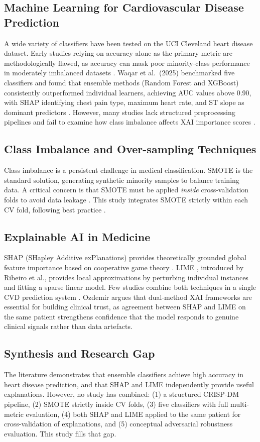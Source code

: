 \documentclass[conference]{IEEEtran}
\begin{document}
\subsection{Machine Learning for Cardiovascular Disease Prediction}
A wide variety of classifiers have been tested on the UCI Cleveland heart disease dataset. Early studies relying on accuracy alone as the primary metric are methodologically flawed, as accuracy can mask poor minority-class performance in moderately imbalanced datasets \cite{ali2019}. Waqar et al.\ (2025) benchmarked five classifiers and found that ensemble methods (Random Forest and XGBoost) consistently outperformed individual learners, achieving AUC values above 0.90, with SHAP identifying chest pain type, maximum heart rate, and ST slope as dominant predictors \cite{lamir2025}. However, many studies lack structured preprocessing pipelines and fail to examine how class imbalance affects XAI importance scores \cite{uddin2026}.

\subsection{Class Imbalance and Over-sampling Techniques}
Class imbalance is a persistent challenge in medical classification. SMOTE \cite{fernandez2018} is the standard solution, generating synthetic minority samples to balance training data. A critical concern is that SMOTE must be applied \textit{inside} cross-validation folds to avoid data leakage \cite{yadav2020}. This study integrates SMOTE strictly within each CV fold, following best practice \cite{mujahid2024}.

\subsection{Explainable AI in Medicine}
SHAP (SHapley Additive exPlanations) provides theoretically grounded global feature importance based on cooperative game theory \cite{kim2025}. LIME \cite{ribeiro2016}, introduced by Ribeiro et al., provides local approximations by perturbing individual instances and fitting a sparse linear model. Few studies combine both techniques in a single CVD prediction system \cite{ahmed2024, admassu2023}. Ozdemir \cite{ozdemir2024} argues that dual-method XAI frameworks are essential for building clinical trust, as agreement between SHAP and LIME on the same patient strengthens confidence that the model responds to genuine clinical signals rather than data artefacts.

\subsection{Synthesis and Research Gap}
The literature demonstrates that ensemble classifiers achieve high accuracy in heart disease prediction, and that SHAP and LIME independently provide useful explanations. However, no study has combined: (1) a structured CRISP-DM pipeline, (2) SMOTE strictly inside CV folds, (3) five classifiers with full multi-metric evaluation, (4) both SHAP and LIME applied to the same patient for cross-validation of explanations, and (5) conceptual adversarial robustness evaluation. This study fills that gap.
\end{document}
